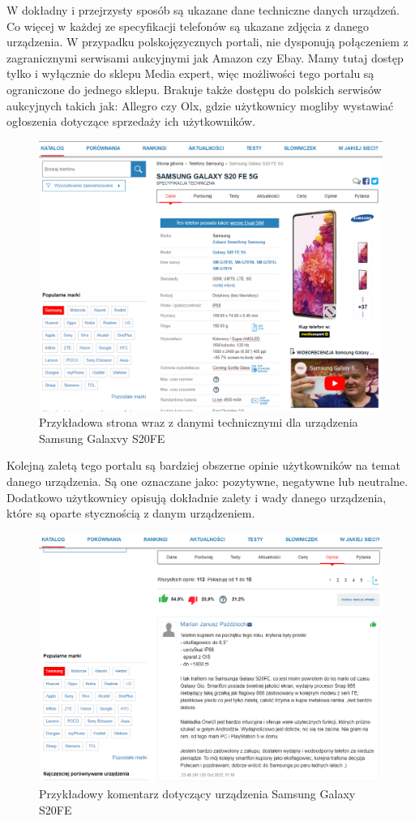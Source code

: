 W dokładny i przejrzysty sposób są ukazane dane techniczne danych urządzeń. Co więcej w każdej ze specyfikacji telefonów są ukazane zdjęcia z danego urządzenia. W przypadku polskojęzycznych portali, nie dysponują połączeniem z zagranicznymi serwisami aukcyjnymi jak Amazon czy Ebay. Mamy tutaj dostęp tylko i wyłącznie do sklepu Media expert, więc możliwości tego portalu są ograniczone do jednego sklepu.
Brakuje także dostępu do polskich serwisów aukcyjnych takich jak: Allegro czy Olx, gdzie użytkownicy mogliby wystawiać ogłoszenia dotyczące sprzedaży ich użytkowników.
\begin{figure}[H]
    \centering
    \includegraphics[width=15cm]{img/mgsm/DetailsMgsm.png}
    \caption{Przykładowa strona wraz z danymi technicznymi dla urządzenia Samsung Galaxvy S20FE}
    \label{mgsm_2}
\end{figure}
Kolejną zaletą tego portalu są bardziej obszerne opinie użytkowników na temat danego urządzenia. Są one oznaczane jako: pozytywne, negatywne lub neutralne. Dodatkowo użytkownicy opisują dokładnie zalety i wady danego urządzenia, które są oparte stycznością z danym urządzeniem.
\begin{figure}[H]
    \centering
    \includegraphics[width=15cm]{img/mgsm/mgsmComments.png}
    \caption{Przykładowy komentarz dotyczący urządzenia Samsung Galaxy S20FE}
    \label{mgsm_3}
\end{figure}
